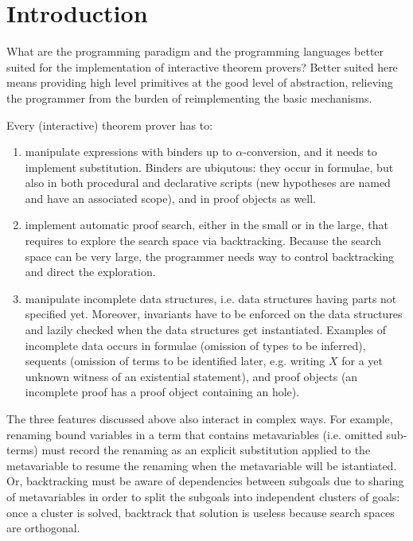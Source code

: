 \documentclass[preprint]{sigplanconf}
\begin{document}
\section{Introduction}
What are the programming paradigm and the programming languages better suited for the implementation of interactive theorem provers? Better suited here means providing high level primitives at the good level of abstraction, relieving the programmer from the burden of reimplementing the basic mechanisms.

Every (interactive) theorem prover has to:
\begin{enumerate}
\item manipulate expressions with binders up to $\alpha$-conversion, and it needs to implement substitution. Binders are ubiqutous: they occur in formulae, but also in both procedural and declarative scripts (new hypotheses are named and have an associated scope), and in proof objects as well.
\item implement automatic proof search, either in the small or in the large, that requires to explore the search space via backtracking. Because the search space can be very large, the programmer needs way to control backtracking and direct the exploration.
\item manipulate incomplete data structures, i.e. data structures having parts not specified yet. Moreover, invariants have to be enforced on the data structures and lazily checked when the data structures get instantiated. Examples of incomplete data occurs in formulae (omission of types to be inferred), sequents (omission of terms to be identified later, e.g. writing $X$ for a yet unknown witness of an existential statement), and proof objects (an incomplete proof has a proof object containing an hole).
\end{enumerate}

The three features discussed above also interact in complex ways. For example, renaming bound variables in a term that contains metavariables (i.e. omitted sub-terms) must record the renaming as an explicit substitution applied to the metavariable to resume the renaming when the metavariable will be istantiated. Or, backtracking must be aware of dependencies between subgoals due to sharing of metavariables in order to split the subgoals into independent clusters of goals: once a cluster is solved, backtrack that solution is useless because search spaces are orthogonal.
\end{document}
